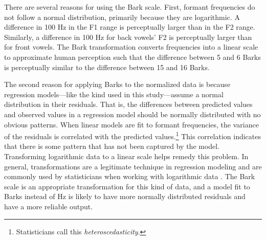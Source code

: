 There are several reasons for using the Bark scale. First, formant frequencies do not follow a normal distribution, primarily because they are logarithmic. A difference in 100 Hz in the F1 range is perceptually larger than in the F2 range. Similarly, a difference in 100 Hz for back vowels’ F2 is perceptually larger than for front vowels. The Bark transformation converts frequencies into a linear scale to approximate human perception such that the difference between 5 and 6 Barks is perceptually similar to the difference between 15 and 16 Barks.

The second reason for applying Barks to the normalized data is because regression models---like the kind used in this study---assume a normal distribution in their residuals. That is, the differences between predicted values and observed values in a regression model should be normally distributed with no obvious patterns. When linear models are fit to formant frequencies, the variance of the residuals is correlated with the predicted values.\footnote{Statisticians call this \textit{hetero\-scedasticity}.} This correlation indicates that there is some pattern that has not been captured by the model. Transforming logarithmic data to a linear scale helps remedy this problem. In general, transformations are a legitimate technique in regression modeling and are commonly used by statisticians when working with logarithmic data \citep{gelman_hill_2007}. The Bark scale is an appropriate transformation for this kind of data, and a model fit to Barks instead of Hz is likely to have more normally distributed residuals and have a more reliable output.


